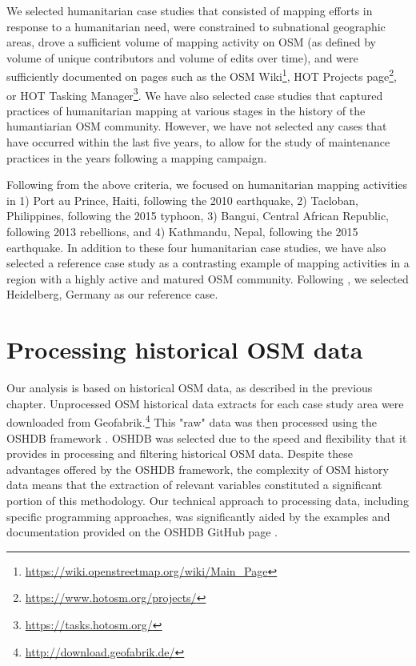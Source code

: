 We selected humanitarian case studies that consisted of mapping efforts in response to a humanitarian need, were constrained to subnational geographic areas, drove a sufficient volume of mapping activity on OSM (as defined by volume of unique contributors and volume of edits over time), and were sufficiently documented on pages such as the OSM Wiki\footnote{\url{https://wiki.openstreetmap.org/wiki/Main_Page}}, HOT Projects page\footnote{\url{https://www.hotosm.org/projects/}}, or HOT Tasking Manager\footnote{\url{https://tasks.hotosm.org/}}. We have also selected case studies that captured practices of humanitarian mapping at various stages in the history of the humantiarian OSM community. However, we have not selected any cases that have occurred within the last five years, to allow for the study of maintenance practices in the years following a mapping campaign.  

Following from the above criteria, we focused on humanitarian mapping activities in 1) Port au Prince, Haiti, following the 2010 earthquake, 2) Tacloban, Philippines, following the 2015 typhoon, 3) Bangui, Central African Republic, following 2013 rebellions, and 4) Kathmandu, Nepal, following the 2015 earthquake. In addition to these four humanitarian case studies, we have also selected a reference case study as a contrasting example of mapping activities in a region with a highly active and matured OSM community. Following \textcite{anderson_crowd_2018}, we selected Heidelberg, Germany as our reference case.

\section{Processing historical OSM data}
\label{sec:history}

Our analysis is based on historical OSM data, as described in the previous chapter. Unprocessed OSM historical data extracts for each case study area were downloaded from Geofabrik.\footnote{\url{http://download.geofabrik.de/}} This "raw" data was then processed using the OSHDB framework \parencite{raifer_oshdb_2019}. OSHDB was selected due to the speed and flexibility that it provides in processing and filtering historical OSM data. Despite these advantages offered by the OSHDB framework, the complexity of OSM history data means that the extraction of relevant variables constituted a significant portion of this methodology. Our technical approach to processing data, including specific programming approaches, was significantly aided by the examples and documentation provided on the OSHDB GitHub page \parencite{heidelberg_institute_for_geoinformation_technology_oshdb_2020}.

